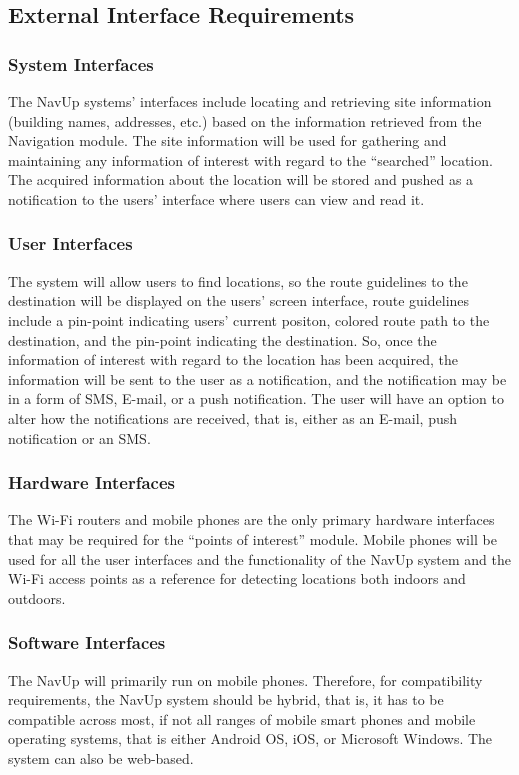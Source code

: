 \subsection{External Interface Requirements}
	\subsubsection{System Interfaces}
The NavUp systems’ interfaces include locating and retrieving site information (building names, addresses, etc.) based on the information retrieved from the Navigation module. The site information will be used for gathering and maintaining any information of interest with regard to the “searched” location. The acquired information about the location will be stored and pushed as a notification to the users’ interface where users can view and read it.
	\subsubsection{User Interfaces}
The system will allow users to find locations, so the route guidelines to the destination will be displayed on the users’ screen interface, route guidelines include a pin-point indicating users’ current positon, colored route path to the destination, and the pin-point indicating the destination. So, once the information of interest with regard to the location has been acquired, the information will be sent to the user as a notification, and the notification may be in a form of SMS, E-mail, or a push notification. The user will have an option to alter how the notifications are received, that is, either as an E-mail, push notification or an SMS.
	\subsubsection{Hardware Interfaces}
The Wi-Fi routers and mobile phones are the only primary hardware interfaces that may be required for the “points of interest” module. Mobile phones will be used for all the user interfaces and the functionality of the NavUp system and the Wi-Fi access points as a reference for detecting locations both indoors and outdoors.
	\subsubsection{Software Interfaces}
The NavUp will primarily run on mobile phones. Therefore, for compatibility requirements, the NavUp system should be hybrid, that is, it has to be compatible across most, if not all ranges of mobile smart phones and mobile operating systems, that is either Android OS, iOS, or Microsoft Windows. The system can also be web-based.
